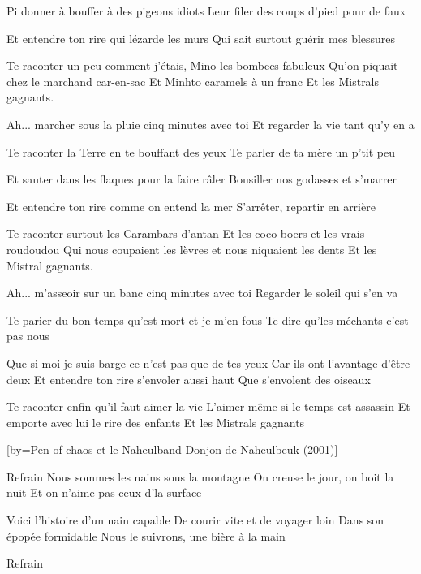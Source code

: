 \beginverse
Pi donner à bouffer à des pigeons idiots
Leur filer des coups d'pied pour de faux
\endverse

\beginverse
Et entendre ton rire qui lézarde les murs
Qui sait surtout guérir mes blessures
\endverse

\beginverse
Te raconter un peu comment j'étais,
Mino les bombecs fabuleux
Qu'on piquait chez le marchand car-en-sac
Et Minhto caramels à un franc 
Et les Mistrals gagnants.
\endverse

\beginverse
Ah... marcher sous la pluie cinq minutes avec toi
Et regarder la vie tant qu'y en a
\endverse

\beginverse
Te raconter la Terre en te bouffant des yeux
Te parler de ta mère un p'tit peu
\endverse

\beginverse
Et sauter dans les flaques pour la faire râler
Bousiller nos godasses et s'marrer
\endverse

\beginverse
Et entendre ton rire comme on entend la mer
S'arrêter, repartir en arrière
\endverse

\beginverse
Te raconter surtout les Carambars d'antan
Et les coco-boers et les vrais roudoudou
Qui nous coupaient les lèvres et nous niquaient les dents
Et les Mistral gagnants.
\endverse

\beginverse
Ah... m'asseoir sur un banc cinq minutes avec toi
Regarder le soleil qui s'en va
\endverse

\beginverse
Te parier du bon temps qu'est mort et je m'en fous
Te dire qu'les méchants c'est pas nous
\endverse

\beginverse
Que si moi je suis barge ce n'est pas que de tes yeux
Car ils ont l'avantage d'être deux
Et entendre ton rire s'envoler aussi haut
Que s'envolent des oiseaux
\endverse

\beginverse
Te raconter enfin qu'il faut aimer la vie
L'aimer même si le temps est assassin
Et emporte avec lui le rire des enfants
Et les Mistrals gagnants
\endverse

[by={Pen of chaos et le Naheulband \- Donjon de Naheulbeuk (2001)}]

\beginverse
Refrain
Nous sommes les nains sous la montagne
On creuse le jour, on boit la nuit
Et on n'aime pas ceux d'la surface \!
\endverse

\beginverse
Voici l'histoire d'un nain capable
De courir vite et de voyager loin
Dans son épopée formidable
Nous le suivrons, une bière à la main \!
\endverse

\beginverse
Refrain
\endverse

